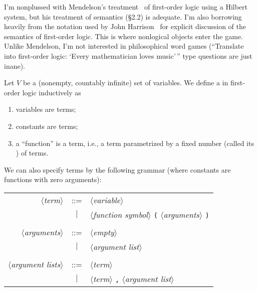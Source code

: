 \begin{node}\label{fol-0000}%
I'm nonplussed with Mendelson's treatment~\cite{mendelson2015mathematical}
of first-order logic using a Hilbert system, but his treatment of
semantics (\S2.2) is adequate. I'm also borrowing heavily from the
notation used by John Harrison~\cite{harrison2009handbook} for explicit
discussion of the semantics of first-order logic. This is where nonlogical
objects enter the game. Unlike Mendelson, I'm not interested in
philosophical word games (``Translate into first-order logic: `Every
mathematician loves music'\,'' type questions are just inane).
\end{node}

\begin{node}[Syntax]\label{fol-0001}%
\begin{definition}\label{fol-0002}%
Let $V$ be a (nonempty, countably infinite) set of variables. We define
a  in first-order logic inductively as
\begin{enumerate}
\item variables are terms;
\item constants are terms;
\item a ``function'' is a term, i.e., a term parametrized by a fixed
  number (called its ) of terms.
\end{enumerate}
We can also specify terms by the following grammar (where
constants are functions with zero arguments):
\begin{center}
\begin{tabular}{rcl}
$\langle$\textit{term}$\rangle$ & ::= & $\langle$\textit{variable}$\rangle$\\
& $|$ & $\langle$\textit{function symbol}$\rangle$ \verb#(# $\langle$\textit{arguments}$\rangle$ \verb#)#\\
  & & \\
$\langle$\textit{arguments}$\rangle$ & ::= & $\langle$\textit{empty}$\rangle$\\
  & $|$ & $\langle$\textit{argument list}$\rangle$\\
  & & \\
$\langle$\textit{argument lists}$\rangle$ & ::= & $\langle$\textit{term}$\rangle$\\
  & $|$ & $\langle$\textit{term}$\rangle$ \verb#,# $\langle$\textit{argument list}$\rangle$\\
\end{tabular}
\end{center}
\end{definition}


\end{node}
